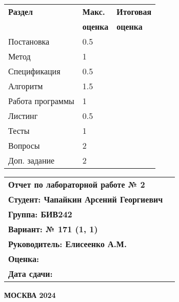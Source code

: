 \begin{titlepage}
    \begin{minipage}{0.45\textwidth}
        \begin{tabular}{|l|l|l|}
            \hline
            \textbf{Раздел} & \textbf{Макс.} & \textbf{Итоговая}\\
            & \textbf{оценка} & \textbf{оценка} \\[2ex]
            \hline
            Постановка & 0.5 & \\[3ex]
            \hline
            Метод & 1 & \\[3ex]
            \hline
            Спецификация & 0.5 & \\[3ex]
            \hline
            Алгоритм & 1.5 & \\[3ex]
            \hline
            Работа программы & 1 & \\[3ex]
            \hline
            Листинг & 0.5 & \\[3ex]
            \hline
            Тесты & 1 & \\[3ex]
            \hline
            Вопросы & 2 & \\[3ex]
            \hline
            Доп. задание & 2 & \\[3ex]
            \hline
        \end{tabular}
    \end{minipage}%
    \hfill
    \begin{minipage}{0.45\textwidth}
        \begin{tabular}{lc}
            \textbf{Отчет по лабораторной работе № 2} & \\[2ex]
            \textbf{Студент: Чапайкин Арсений Георгиевич} &\\[2ex]
            \textbf{Группа: БИВ242} & \\[2ex]
            \textbf{Вариант: № 171 (1, 1)} &\\[2ex]
            \textbf{Руководитель: Елисеенко А.М.} &\\[2ex]
            \textbf{Оценка:} &\\[2ex]
            \textbf{Дата сдачи:} &\\[2ex]
        \end{tabular}
    \end{minipage}%
    \vspace*{\fill}
    \begin{center}
        \textbf{МОСКВА 2024}
    \end{center}
\end{titlepage}